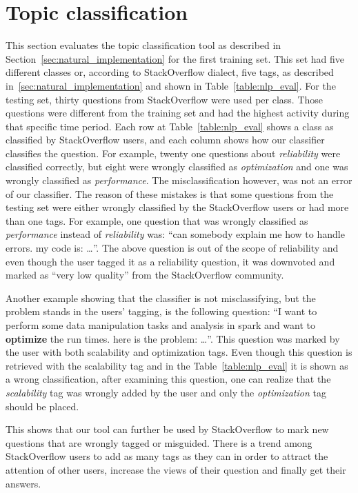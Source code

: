 \section{Topic classification}
\label{sec:nlp_evaluation}
This section evaluates the topic classification tool as described in Section~\ref{sec:natural_implementation} for the first training set. This set had five different classes or, according to StackOverflow dialect, five tags, as described in~\ref{sec:natural_implementation} and shown in Table~\ref{table:nlp_eval}. For the testing set, thirty questions from StackOverflow were used per class. Those questions were different from the training set and had the highest activity during that specific time period. Each row at Table~\ref{table:nlp_eval} shows a class as classified by StackOverflow users, and each column shows how our classifier classifies the question. For example, twenty one questions about \emph{reliability} were classified correctly, but eight were wrongly classified as \emph{optimization} and one was wrongly classified as \emph{performance}. The misclassification however, was not an error of our classifier. The reason of these mistakes is that  some questions from the testing set were either wrongly classified by the StackOverflow users or had more than one tags. For example, one question that was wrongly classified as \emph{performance} instead of \emph{reliability} was: ``can somebody explain me how to handle errors. my code is: \ldots''. The above question is out of the scope of reliability and even though the user tagged it as a reliability question, it was downvoted and marked as ``very low quality'' from the StackOverflow community.

Another example showing that the classifier is not misclassifying, but the problem stands in the users' tagging, is the following question:
``I want to perform some data manipulation tasks and analysis in spark and want to \textbf{optimize} the run times. 
here is the problem: \ldots ''. 
This question was marked by the user with both scalability and optimization tags. Even though this question is retrieved with the scalability tag and in the Table~\ref{table:nlp_eval} it is shown as a wrong classification, after examining this question, one can realize that the \emph{scalability} tag was wrongly added by the user and only the \emph{optimization} tag should be placed.

This shows that our tool can further be used by StackOverflow to mark new questions that are wrongly tagged or misguided. There is a trend among StackOverflow users to add as many tags as they can in order to attract the attention of other users, increase the views of their question and finally get their answers.  

